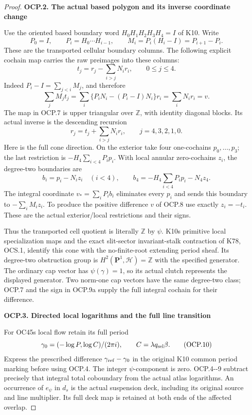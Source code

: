 \begin{proof}
\medskip\noindent\textbf{OCP.2. The actual based polygon and its inverse coordinate change}

\par\nobreak

Use the oriented based boundary word \(H_0H_1H_2H_3H_4=I\) of K10.
Write
\[
P_0=I,\qquad P_i=H_0\cdots H_{i-1},\qquad
M_i=P_i(H_i-I)=P_{i+1}-P_i.
\tag{OCP.6}
\]
These are the transported cellular boundary columns. The following
explicit cochain map carries the raw preimages into these columns:
\[
t_j=r_j-\sum_{i>j}N_i r_i,\qquad 0\leq j\leq4.
\tag{OCP.7}
\]
Indeed \(P_i-I=\sum_{j<i}M_j\), and therefore
\[
\sum_jM_jt_j
=\sum_i\{P_iN_i-(P_i-I)N_i\}r_i
=\sum_iN_ir_i=v.
\tag{OCP.8}
\]
The map in OCP.7 is upper triangular over \(\mathbb Z\), with identity
diagonal blocks. Its actual inverse is the descending recursion
\[
r_j=t_j+\sum_{i>j}N_ir_i,\qquad j=4,3,2,1,0.
\tag{OCP.9}
\]
Here is the full cone direction. On the exterior take four one-cochains
\(p_0,\ldots,p_3\); the last restriction is
\(-H_4\sum_{i<4}P_ip_i\). With local annular zero-cochains \(z_i\),
the degree-two boundaries are
\[
b_i=p_i-N_i z_i\quad(i<4),\qquad
b_4=-H_4\sum_{i<4}P_ip_i-N_4z_4.
\tag{OCP.9a}
\]
The integral coordinate \(v_* = \sum_iP_i b_i\) eliminates every
\(p_i\) and sends this boundary to \(-\sum_iM_i z_i\). To produce
the positive difference \(v\) of OCP.8 use exactly \(z_i=-t_i\).
These are the actual exterior/local restrictions and their signs.

Thus the transported cell quotient is literally \(\mathbb Z\) by
\(\psi\). K10\textquotesingle s primitive local specialization maps and the exact
slit-sector invariant-stalk contraction of K78, OCS.1, identify this
cone with the no-finite-root extending period sheaf. Its
degree-two obstruction group is \(H^2(\mathbf P^1,\mathscr H)=\mathbb Z\)
with the specified generator. The ordinary cap vector has
\(\psi(\gamma)=1\), so its actual clutch represents the displayed
generator. Two norm-one cap vectors have the same degree-two class;
OCP.7 and the sign in OCP.9a supply the full integral cochain for their
difference.

\par

\medskip\noindent\textbf{OCP.3. Directed local logarithms and the full line transition}

\par\nobreak

For OC45\textquotesingle s local flow retain its full period
\[
\gamma_0=( -\log P,\log C)/(2\pi i),\qquad
C=\lambda q_{\rm sel}\beta.
\tag{OCP.10}
\]
Express the prescribed difference \(\gamma_{\rm ref}-\gamma_0\)
in the original K10 common period marking before using OCP.4.
The integer \(\psi\)-component is zero. OCP.4-\/-9 subtract precisely
that integral total coboundary from the actual atlas logarithms.
An occurrence of \(e_\psi\) in \(d_s\) is the actual suspension
deck, including its original source and line multiplier. Its full
deck map is retained at both ends of the affected overlap.


\end{proof}
